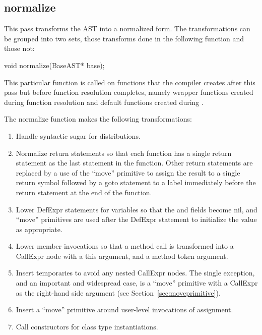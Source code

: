 \documentclass[10pt]{article}
\begin{document}
\subsection{normalize}

This pass transforms the AST into a normalized form.  The
transformations can be grouped into two sets, those transforms done in
the following function and those not:
\begin{clang}
void normalize(BaseAST* base);
\end{clang}
This particular function is called on functions that the compiler
creates after this pass but before function resolution completes,
namely wrapper functions created during function resolution and
default functions created during .

The normalize function makes the following transformations:
\begin{enumerate}
\item Handle syntactic sugar for distributions.
\item Normalize return statements so that each function has a single
  return statement as the last statement in the function.  Other
  return statements are replaced by a use of the ``move'' primitive to
  assign the result to a single return symbol followed by a goto
  statement to a label immediately before the return statement at the
  end of the function.
\item Lower DefExpr statements for variables so that the  and
   fields become nil, and ``move'' primitives are used
  after the DefExpr statement to initialize the value as appropriate.
\item Lower member invocations so that a method call is transformed
  into a CallExpr node with a this argument, and a method token
  argument.
\item Insert temporaries to avoid any nested CallExpr nodes.  The
  single exception, and an important and widespread case, is a
  ``move'' primitive with a CallExpr as the right-hand side argument
  (see Section~\ref{sec:moveprimitive}).
\item Insert a ``move'' primitive around user-level invocations of
  assignment.
\item Call constructors for class type instantiations.
\end{enumerate}
\end{document}

